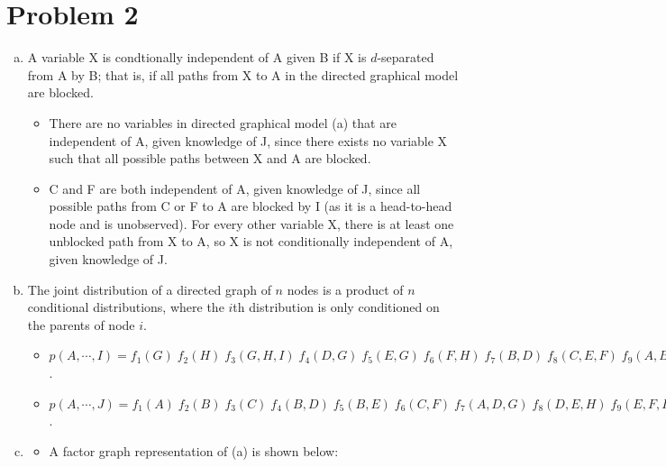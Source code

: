 \documentclass{article}
\begin{document}
    \newpage
    \section*{Problem 2}

        \begin{enumerate}[a)]
            \item
                A variable X is condtionally independent of A given B if X is $d$-separated from A by B; that is, if all paths from X to A in the directed graphical model are blocked. 
                \begin{itemize}
                    \item
                        There are no variables in directed graphical model (a) that are independent of A, given knowledge of J, since there exists no variable X such that all possible paths between X and A are blocked.
                    \item
                        C and F are both independent of A, given knowledge of J, since all possible paths from C or F to A are blocked by I (as it is a head-to-head node and is unobserved). For every other variable X, there is at least one unblocked path from X to A, so X is not conditionally independent of A, given knowledge of J.
                    
                \end{itemize}
            \item
                The joint distribution of a directed graph of $n$ nodes is a product of $n$ conditional distributions, where the $i$th distribution is only conditioned on the parents of node $i$.
                \begin{itemize}
                    \item
                        $p(A, \cdots, I) = f_1(G) \; f_2(H) \; f_3(G, H, I) \; f_4(D, G) \; f_5(E, G) \; f_6(F, H) \; f_7(B, D) \; f_8(C, E, F) \; f_9(A, B, C)$.
                    \item
                        $p(A, \cdots, J)  = f_1(A) \; f_2(B) \; f_3(C) \; f_4(B, D) \; f_5(B, E) \; f_6(C, F) \; f_7(A, D, G) \; f_8(D, E, H) \; f_9(E, F, I) \; f_{10}(G, J)$.
                \end{itemize}
            \item
                \begin{itemize}
                    \item
                        A factor graph representation of (a) is shown below:


\end{itemize}
\end{enumerate}
\end{document}
